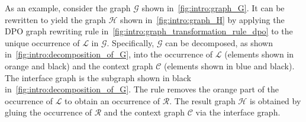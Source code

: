 As an example, consider the graph $\mathcal{G}$ shown in~\autoref{fig:intro:graph_G}. 
It can be rewritten to yield the graph $\mathcal{H}$ shown in~\autoref{fig:intro:graph_H} by applying the DPO graph rewriting rule in~\autoref{fig:intro:graph_transformation_rule_dpo} to the unique occurrence of $\mathcal{L}$ in $\mathcal{G}$.
Specifically, $\mathcal{G}$ can be decomposed, as shown in~\autoref{fig:intro:decomposition_of_G}, into the occurrence of $\mathcal{L}$ (elements shown in orange and black) and the context graph $\mathcal{C}$ (elements shown in blue and black). The interface graph is the subgraph shown in black in~\autoref{fig:intro:decomposition_of_G}. The rule removes the orange part of the occurrence of $\mathcal{L}$ to obtain an occurrence of $\mathcal{R}$. 
The result graph $\mathcal{H}$ is obtained by gluing the occurrence of $\mathcal{R}$ and the context graph $\mathcal{C}$ via the interface graph.
  
